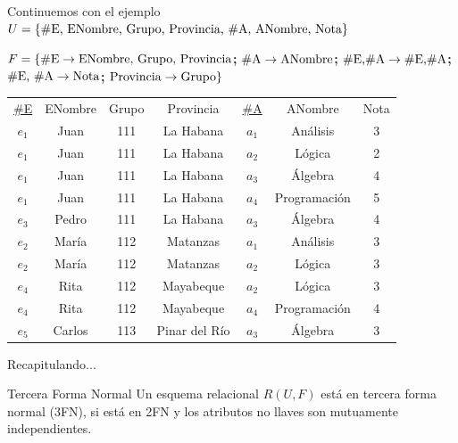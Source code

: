 \begin{frame}{Continuemos con el ejemplo}
        $U = \{ \textnormal{\#E, ENombre,  Grupo, Provincia, \#A, ANombre, Nota}\}$

        $F = \{\textnormal{\#E} \to \textnormal{ENombre, Grupo, Provincia}${\bf;}\; $\textnormal{\#A} \to \textnormal{ANombre}${\bf;}\; $\textnormal{\#E,\#A} \to \textnormal{\#E,\#A}${\bf;}\; $\textnormal{\#E, \#A} \to \textnormal{Nota}${\bf;}\; $\textnormal{Provincia} \to \textnormal{Grupo}\}$\\[4mm]

    \centering
    \begin{tabular}{ccccccc}
        \underline{\#E} & ENombre & Grupo & Provincia & \underline{\#A} & ANombre & Nota\\
        $e_1$ & Juan & {111} & { La Habana} & $a_1$ & An\'alisis & 3\\
        $e_1$ & Juan & {111} & { La Habana} & $a_2$ & L\'ogica & 2\\
        $e_1$ & Juan & {111} & { La Habana} & $a_3$ & \'Algebra & 4\\
        $e_1$ & Juan & {111} & { La Habana} & $a_4$ & Programaci\'on & 5\\
        $e_3$ & Pedro & {111} & { La Habana} & $a_3$ & \'Algebra & 4\\
        $e_2$ & Mar\'ia & {112} & { Matanzas} & $a_1$ & An\'alisis & 3\\
        $e_2$ & Mar\'ia &  {112} & { Matanzas} & $a_2$ & L\'ogica & 3\\
        $e_4$ & Rita &  {112} & { Mayabeque} & $a_2$ & L\'ogica & 3\\
        $e_4$ & Rita &  {112} & { Mayabeque} & $a_4$ & Programaci\'on & 4\\
        $e_5$ & Carlos &  {113} & { Pinar del R\'io} & $a_3$ & \'Algebra & 3
    \end{tabular}

\end{frame}

\begin{frame}{Recapitulando...}
    \begin{block}{Tercera Forma Normal}
        Un esquema relacional $R(U,F)$ est\'a en tercera forma normal
        (3FN), si est\'a en 2FN y los atributos no llaves son mutuamente independientes.
        
    \end{block}
\end{frame}

